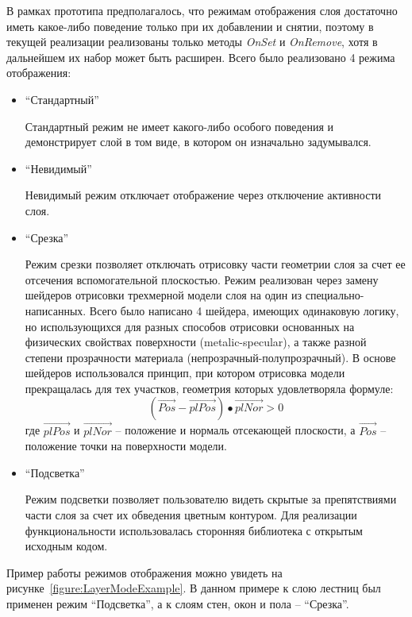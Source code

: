 В рамках прототипа предполагалось, что режимам отображения слоя
достаточно иметь какое-либо поведение только при их добавлении и снятии,
поэтому в текущей реализации реализованы только методы
\emph{OnSet} и \emph{OnRemove}, хотя в дальнейшем
их набор может быть расширен. Всего было реализовано 4 режима отображения:

\begin{itemize}
    \item {
        ``Стандартный''

        Стандартный режим не имеет какого-либо особого поведения и
        демонстрирует слой в том виде, в котором он изначально задумывался.
    }
    \item {
        ``Невидимый''

        Невидимый режим отключает отображение через отключение активности слоя.
    }
    \item {
        ``Срезка''

        Режим срезки позволяет отключать отрисовку части геометрии слоя
        за счет ее отсечения вспомогательной плоскостью.
        Режим реализован через замену шейдеров отрисовки трехмерной
        модели слоя на один из специально-написанных.
        Всего было написано 4 шейдера, имеющих одинаковую логику,
        но использующихся для разных способов отрисовки основанных на физических
        свойствах поверхности (metalic-specular\cite{DocUnity}),
        а также разной степени прозрачности материала (непрозрачный-полупрозрачный).
        В основе шейдеров использовался принцип,
        при котором отрисовка модели прекращалась для тех участков,
        геометрия которых удовлетворяла формуле:
        \[
            ( \overrightarrow{Pos} - \overrightarrow{plPos} ) \bullet
            \overrightarrow{plNor} > 0
        \]
        где $\overrightarrow{plPos}$ и $\overrightarrow{plNor}$ --
        положение и нормаль отсекающей плоскости,
        а $\overrightarrow{Pos}$ -- положение точки на поверхности модели.%
        \cite{UnityCrossSection}
    }
    \item {
        ``Подсветка''

        Режим подсветки позволяет пользователю видеть скрытые за препятствиями
        части слоя за счет их обведения цветным контуром.
        Для реализации функциональности использовалась сторонняя библиотека
        с открытым исходным кодом.\cite{UnityFxOutline}
    }
\end{itemize}

Пример работы режимов отображения можно увидеть на рисунке~\ref{figure:LayerModeExample}.
В данном примере к слою лестниц был применен режим ``Подсветка'',
а к слоям стен, окон и пола -- ``Срезка''.

